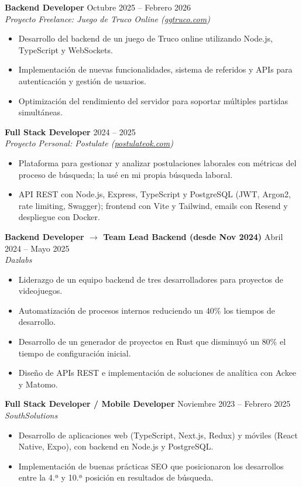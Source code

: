 \documentclass[10pt,a4paper]{article}
\newcommand{\job}[3]{%
  \textbf{#1} \hfill {\small #3}\\
  \textit{#2}%
}
\begin{document}
\vspace{2pt}
\job{Backend Developer}{Proyecto Freelance: Juego de Truco Online (\href{https://ggtruco.com}{ggtruco.com})}{Octubre 2025 -- Febrero 2026}
\begin{itemize}
  \item Desarrollo del backend de un juego de Truco online utilizando Node.js, TypeScript y WebSockets.
  \item Implementación de nuevas funcionalidades, sistema de referidos y APIs para
        autenticación y gestión de usuarios.
  \item Optimización del rendimiento del servidor para soportar múltiples partidas simultáneas.
\end{itemize}

\vspace{2pt}
\job{Full Stack Developer}{Proyecto Personal: Postulate (\href{https://postulateok.com}{postulateok.com})}{2024 -- 2025}
\begin{itemize}
  \item Plataforma para gestionar y analizar postulaciones laborales con métricas del proceso
        de búsqueda; la usé en mi propia búsqueda laboral.
  \item API REST con Node.js, Express, TypeScript y PostgreSQL (JWT, Argon2, rate limiting,
        Swagger); frontend con Vite y Tailwind, emails con Resend y despliegue con Docker.
\end{itemize}

\vspace{2pt}
\job{Backend Developer $\rightarrow$ Team Lead Backend (desde Nov 2024)}{Dazlabs}{Abril 2024 -- Mayo 2025}
\begin{itemize}
  \item Liderazgo de un equipo backend de tres desarrolladores para proyectos de videojuegos.
  \item Automatización de procesos internos reduciendo un 40\% los tiempos de desarrollo.
  \item Desarrollo de un generador de proyectos en Rust que disminuyó un 80\% el tiempo
        de configuración inicial.
  \item Diseño de APIs REST e implementación de soluciones de analítica con Ackee y Matomo.
\end{itemize}

\vspace{2pt}
\job{Full Stack Developer / Mobile Developer}{SouthSolutions}{Noviembre 2023 -- Febrero 2025}
\begin{itemize}
  \item Desarrollo de aplicaciones web (TypeScript, Next.js, Redux) y móviles (React Native,
        Expo), con backend en Node.js y PostgreSQL.
  \item Implementación de buenas prácticas SEO que posicionaron los desarrollos entre la
        4.ª y 10.ª posición en resultados de búsqueda.
\end{itemize}
\end{document}
